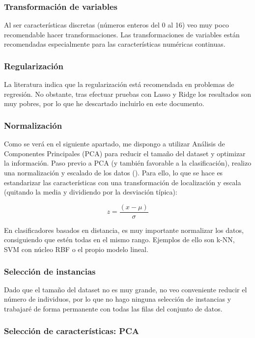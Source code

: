 \subsubsection{Transformación de variables}

Al ser características discretas (números enteros del 0 al 16) veo muy poco recomendable hacer transformaciones. Las transformaciones de variables están recomendadas especialmente para las características numéricas continuas.

\subsubsection{Regularización}

La literatura indica que la regularización está recomendada en problemas de regresión. No obstante, tras efectuar pruebas con Lasso y Ridge los resultados son muy pobres, por lo que he descartado incluirlo en este documento.

\subsubsection{Normalización}

Como se verá en el siguiente apartado, me dispongo a utilizar Análisis de Componentes Principales (PCA) para reducir el tamaño del dataset y optimizar la información. Paso previo a PCA (y también favorable a la clasificación), realizo una normalización y escalado de los datos (\cite{st-sc}). Para ello, lo que se hace es estandarizar las características con una transformación de localización y escala (quitando la media y dividiendo por la desviación típica):

$$ z = \frac{(x-\mu)}{\sigma} $$ 


En clasificadores basados en distancia, es muy importante normalizar los datos, consiguiendo que estén todas en el mismo rango. Ejemplos de ello son k-NN, SVM con núcleo RBF o el propio modelo lineal.

\subsubsection{Selección de instancias}

Dado que el tamaño del dataset no es muy grande, no veo conveniente reducir el número de individuos, por lo que no hago ninguna selección de instancias y trabajaré de forma permanente con todas las filas del conjunto de datos.

\subsubsection{Selección de características: PCA}

